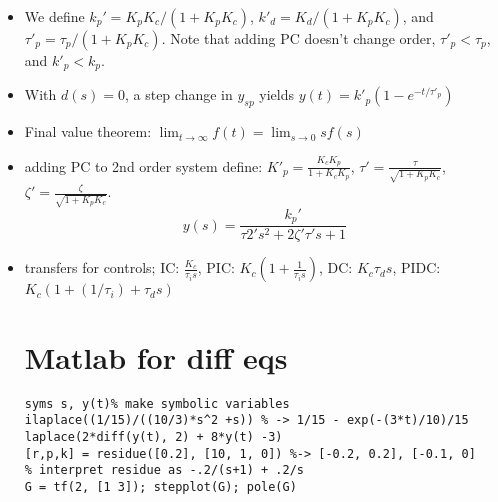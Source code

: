 \documentclass{article}
\begin{document}
\begin{multicols*}{2}
\begin{itemize}
    \item We define $k_p'=K_pK_c/(1+K_pK_c)$, $k'_d = K_d/(1+K_pK_c)$, and $\tau'_p = \tau_p/(1+K_pK_c)$. Note that adding PC doesn't change order, $\tau'_p < \tau_p$, and $k'_p < k_p$.
    \item With $d(s)=0$, a step change in $y_{sp}$ yields $y(t)=k'_p(1 - e^{-t / \tau'_p})$
    \item Final value theorem: $\lim_{t \to \infty} f(t) = \lim_{s \to 0}sf(s)$
    \item adding PC to 2nd order system define: $K'_p = \frac{K_cK_p}{1+K_cK_p}$, $\tau ' = \frac{\tau}{\sqrt{1+K_pK_c}}$, $\zeta '=\frac{\zeta}{\sqrt{1+K_pK_c}}$.
        $$ y(s) = \frac{k_p'}{\tau{2'} s^{2} +2 \zeta ' \tau ' s+1}$$
\item transfers for controls; IC: $\frac{K_c}{\tau_is}$, PIC: $K_c(1+\frac{1}{\tau_is})$, DC: $K_c\tau_ds$, PIDC: $K_c(1+(1/\tau_i) +\tau_ds)$

\section{Matlab for diff eqs}
\begin{lstlisting}
syms s, y(t)% make symbolic variables
ilaplace((1/15)/((10/3)*s^2 +s)) % -> 1/15 - exp(-(3*t)/10)/15
laplace(2*diff(y(t), 2) + 8*y(t) -3)
[r,p,k] = residue([0.2], [10, 1, 0]) %-> [-0.2, 0.2], [-0.1, 0] 
% interpret residue as -.2/(s+1) + .2/s
G = tf(2, [1 3]); stepplot(G); pole(G)

\end{lstlisting}



\end{itemize}
\end{multicols*}
\end{document}
